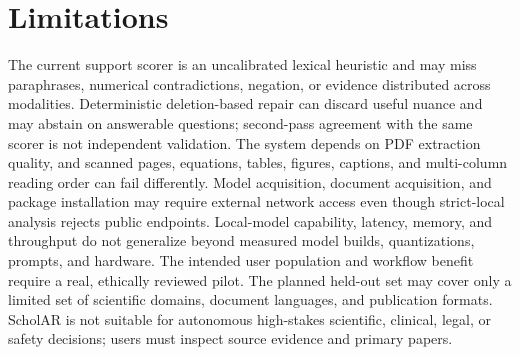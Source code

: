 \section*{Limitations}
The current support scorer is an uncalibrated lexical heuristic and may miss paraphrases, numerical contradictions, negation, or evidence distributed across modalities. Deterministic deletion-based repair can discard useful nuance and may abstain on answerable questions; second-pass agreement with the same scorer is not independent validation. The system depends on PDF extraction quality, and scanned pages, equations, tables, figures, captions, and multi-column reading order can fail differently. Model acquisition, document acquisition, and package installation may require external network access even though strict-local analysis rejects public endpoints. Local-model capability, latency, memory, and throughput do not generalize beyond measured model builds, quantizations, prompts, and hardware. The intended user population and workflow benefit require a real, ethically reviewed pilot. The planned held-out set may cover only a limited set of scientific domains, document languages, and publication formats. ScholAR is not suitable for autonomous high-stakes scientific, clinical, legal, or safety decisions; users must inspect source evidence and primary papers.
